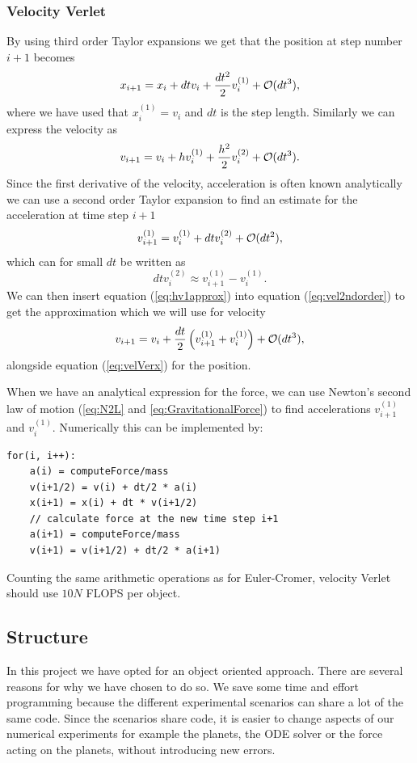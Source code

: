 \documentclass[norsk,a4paper,12pt]{article}
\begin{document}
{\subsubsection{Velocity Verlet}
By using third order Taylor expansions we get that the position at step number $i+1$ becomes \begin{equation}
x_{i+1} = x_i + dt v_i + \frac{dt^2}{2}v_i^{(1)} + {\cal O}(dt^3),
\label{eq:velVerx}
\end{equation}
where we have used that $x_i^{(1)} = v_i$ and $dt$ is the step length. Similarly we can express the velocity as
\begin{equation}
v_{i+1} = v_i + h v_i^{(1)} + \frac{h^2}{2}v_i^{(2)} + {\cal O}(dt^3).
\label{eq:vel2ndorder}
\end{equation}
Since the first derivative of the velocity, acceleration is often known analytically we can use a second order Taylor expansion to find an estimate for the acceleration at time step $i+1$
$$v_{i+1}^{(1)} = v_i^{(1)} + dtv_i^{(2)} + {\cal O}(dt^2), $$
which can for small $dt$ be written as 
\begin{equation}
dtv_i^{(2)} \approx v_{i+1}^{(1)}- v_i^{(1)}.
\label{eq:hv1approx}
\end{equation}
We can then insert equation (\ref{eq:hv1approx}) into equation (\ref{eq:vel2ndorder}) to get the approximation which we will use for velocity
\begin{equation}
v_{i+1} = v_i + \frac{dt}{2}\left(v_{i+1}^{(1)} + v_i^{(1)}\right) + {\cal O}(dt^3),
\label{eq:velVerv}
\end{equation}
alongside equation (\ref{eq:velVerx}) for the position. 

When we have an analytical expression for the force, we can use Newton's second law of motion (\ref{eq:N2L} and \ref{eq:GravitationalForce}) to find accelerations $v_{i+1}^{(1)}$ and $v_{i}^{(1)}$. Numerically this can be implemented by:
\begin{lstlisting}
for(i, i++):
	a(i) = computeForce/mass
	v(i+1/2) = v(i) + dt/2 * a(i)
	x(i+1) = x(i) + dt * v(i+1/2)
	// calculate force at the new time step i+1
	a(i+1) = computeForce/mass
	v(i+1) = v(i+1/2) + dt/2 * a(i+1)
\end{lstlisting}
Counting the same arithmetic operations as for Euler-Cromer, velocity Verlet should use $10N$ FLOPS per object.
\subsection{Structure}
In this project we have opted for an object oriented approach. There are several reasons for why we have chosen to do so. We save some time and effort programming because the different experimental scenarios can share a lot of the same code. Since the scenarios share code, it is easier to change aspects of our numerical experiments for example the planets, the ODE solver or the force acting on the planets, without introducing new errors. 

}
\end{document}
